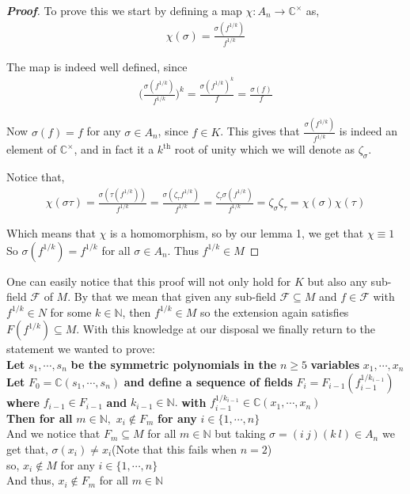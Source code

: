\documentclass[a4paper,12pt,abstracton]{scrartcl}
\theoremstyle{dotlessP}
\theoremstyle{dotlessS}
\theoremstyle{remark}
\theoremstyle{definition}
\begin{document}
\begin{proof}[\textbf{Proof}]
To prove this we start by defining a map $\chi:A_n\rightarrow\mathbb{C}^{\times}$ as,
\begin{align*}
\chi(\sigma)=\frac{\sigma(f^{1/k})}{f^{1/k}}
\end{align*}

The map is indeed well defined, since
\begin{align*}
\bigg(\frac{\sigma(f^{1/k})}{f^{1/k}}\bigg)^k=\frac{\sigma(f^{1/k})^k}{f}=\frac{\sigma(f)}{f}
\end{align*}

Now $\sigma(f)=f$ for any $\sigma\in A_n$, since $f\in K$. This gives that $\frac{\sigma(f^{1/k})}{f^{1/k}}$ is indeed an element of $\mathbb{C}^{\times}$, and in fact it a $k^\text{th}$ root of unity which we will denote as $\zeta_{\sigma}$.

Notice that,
\begin{align*}
\chi(\sigma\tau)=\frac{\sigma(\tau(f^{1/k}))}{f^{1/k}}=\frac{\sigma(\zeta_{\tau}f^{1/k})}{f^{1/k}}=\frac{\zeta_{\tau}\sigma(f^{1/k})}{f^{1/k}}=\zeta_{\sigma}\zeta_{\tau}=\chi(\sigma)\chi(\tau)
\end{align*}

Which means that $\chi$ is a homomorphism, so by our lemma 1, we get that $\chi\equiv 1$
So $\sigma(f^{1/k})=f^{1/k}$ for all $\sigma\in A_n$. Thus $f^{1/k}\in M$
\end{proof}

One can easily notice that this proof will not only hold for $K$ but also any sub-field $\mathcal{F}$ of $M$. By that we mean that given any sub-field $\mathcal{F}\subseteq M$ and $f\in\mathcal{F}$ with $f^{1/k}\in N$ for some $k\in\mathbb{N}$, then $f^{1/k}\in M$ so the extension again satisfies $F(f^{1/k})\subseteq M$. With this knowledge at our disposal we finally return to the statement we wanted to prove:\\

\textbf{Let } $s_1,\cdots,s_n$ \textbf{ be the symmetric polynomials in the } $n\geq 5$ \textbf{ variables } $x_1,\cdots,x_n$ \\ \textbf{Let }  $F_0=\mathbb{C}(s_1,\cdots,s_n)$ \textbf{ and define a sequence of fields } $F_i=F_{i-1}(f_{i-1}^{1/k_{i-1}})$ \textbf{ where } $f_{i-1}\in F_{i-1}$ \textbf{ and } $k_{i-1}\in\mathbb{N}.$ \textbf{ with } $f_{i-1}^{1/k_{i-1}}\in\mathbb{C}(x_1,\cdots,x_n)$ \\
 \textbf{ Then for all } $m\in\mathbb{N},$
$x_i\notin F_m$ \textbf{ for any } $i\in\{1,\cdots,n\}$\\

And we notice that $F_m\subseteq M$ for all $m\in\mathbb{N}$ but taking $\sigma=(i\ j)(k\ l)\in A_n$ we get that, $\sigma(x_i)\neq x_i$(Note that this fails when $n=2$)\\
so, $x_i\notin M$ for any $i\in\{1,\cdots,n\}$\\
And thus, $x_i\notin F_m$ for all $m\in\mathbb{N}$
\end{document}
